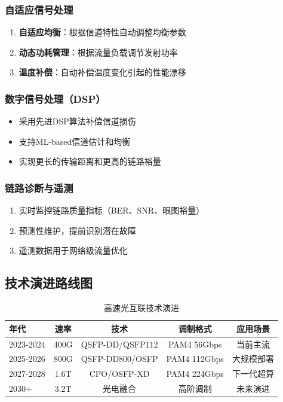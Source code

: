 \subsubsection{自适应信号处理}

\begin{enumerate}
    \item \textbf{自适应均衡}：根据信道特性自动调整均衡参数
    \item \textbf{动态功耗管理}：根据流量负载调节发射功率
    \item \textbf{温度补偿}：自动补偿温度变化引起的性能漂移
\end{enumerate}

\subsubsection{数字信号处理（DSP）}

\begin{itemize}
    \item 采用先进DSP算法补偿信道损伤
    \item 支持ML-based信道估计和均衡
    \item 实现更长的传输距离和更高的链路裕量
\end{itemize}

\subsubsection{链路诊断与遥测}

\begin{enumerate}
    \item 实时监控链路质量指标（BER、SNR、眼图裕量）
    \item 预测性维护，提前识别潜在故障
    \item 遥测数据用于网络级流量优化
\end{enumerate}

\subsection{技术演进路线图}

\begin{table}[htbp]
\centering
\caption{高速光互联技术演进}
\begin{tabular}{|l|c|c|c|c|}
\hline
\textbf{年代} & \textbf{速率} & \textbf{技术} & \textbf{调制格式} & \textbf{应用场景} \\
\hline
2023-2024 & 400G & QSFP-DD/QSFP112 & PAM4 56Gbps & 当前主流 \\
\hline
2025-2026 & 800G & QSFP-DD800/OSFP & PAM4 112Gbps & 大规模部署 \\
\hline
2027-2028 & 1.6T & CPO/OSFP-XD & PAM4 224Gbps & 下一代超算 \\
\hline
2030+ & 3.2T & 光电融合 & 高阶调制 & 未来演进 \\
\hline
\end{tabular}
\end{table}


